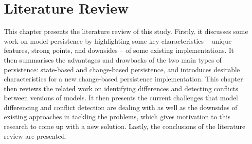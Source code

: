\chapter{Literature Review}
\label{ch:literature_review}

This chapter presents the literature review of this study. Firstly, it discusses some work on model persistence by highlighting some key characteristics -- unique features, strong points, and downsides -- of some existing implementations. It then summarises the advantages and drawbacks of the two main types of persistence: state-based and change-based persistence, and introduces desirable characteristics for a new change-based persistence implementation. This chapter then reviews the related work on identifying differences and detecting conflicts between versions of models. It then presents the current challenges that model differencing and conflict detection are dealing with as well as the downsides of existing approaches in tackling the problems, which gives motivation to this research to come up with a new solution. Lastly, the conclusions of the literature review are presented.  

%
%

